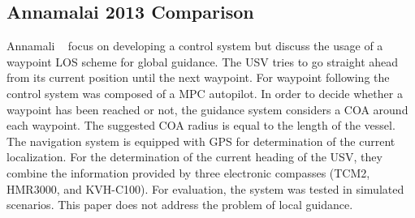     \subsection{Annamalai 2013 Comparison}
    Annamali \etal~\cite{Annamalai2013Comparison} focus on developing a control system but discuss the usage of a waypoint \ac{LOS} scheme \cite{Healey1993Multivariable} for global guidance. The \ac{USV} tries to go straight ahead from its current position until the next waypoint. For waypoint following the control system was composed of a \ac{MPC} autopilot. In order to decide whether a waypoint has been reached or not, the guidance system considers a \ac{COA} around each waypoint. The suggested \ac{COA} radius is equal to the length of the vessel. The navigation system is equipped with \ac{GPS} for determination of the current localization. For the determination of the current heading of the \ac{USV}, they combine the information provided by three electronic compasses (TCM2, HMR3000, and KVH-C100). For evaluation, the system was tested in simulated scenarios. This paper does not address the problem of local guidance.
    
